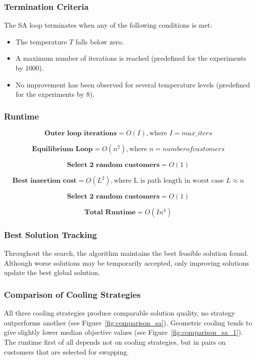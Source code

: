 \documentclass[12pt]{article}
\begin{document}
\subsubsection{Termination Criteria}

The SA loop terminates when any of the following conditions is met:

\begin{itemize}
    \item The temperature $T$ falls below zero.
    \item A maximum number of iterations is reached (predefined for the experiments by 1000).
    \item No improvement has been observed for several temperature levels (predefined for the experiments by 8).
\end{itemize}

\subsubsection{Runtime}

\[
\textbf{Outer loop iterations}=O(I), \text{where } I =  max\_iters
\]

\[
\textbf{Equilibrium Loop}=O(n^2), \text{where } n=number of customers
\]

\[
\textbf{Select 2 random customers}=O(1)
\]

\[
\textbf{Best insertion cost}=O(L^2), \text{where L is path length in worst case } L\approx n
\]

\[
\textbf{Select 2 random customers}=O(1)
\]

\[
\textbf{Total Runtime}=O(I n^4)
\]

\subsubsection{Best Solution Tracking}

Throughout the search, the algorithm maintains the best feasible solution found.
Although worse solutions may be temporarily accepted, only improving solutions update the best global solution.

\subsubsection{Comparison of Cooling Strategies}

All three cooling strategies produce comparable solution quality, no strategy outperforms another (see Figure~\ref{fig:comparison_sa}). Geometric cooling tends to give slightly lower median objective values (see Figure~\ref{fig:comparison_sa_1}). The runtime first of all depends not on cooling strategies, but in pairs on customers that are selected for swapping.
\end{document}
